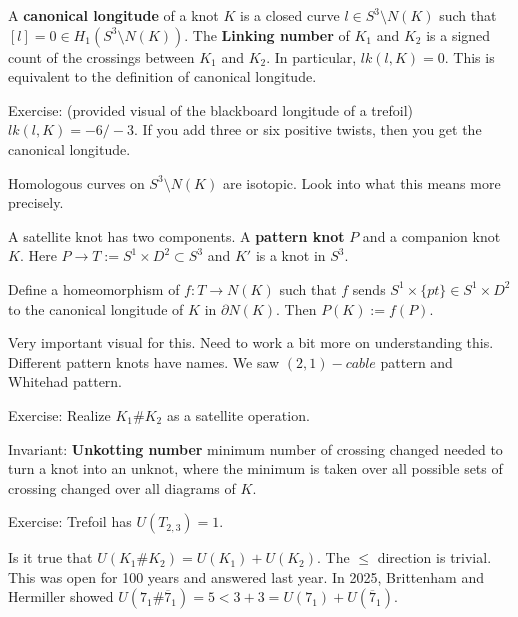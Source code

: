 \documentclass[12pt]{article}
\begin{document}
A \textbf{canonical longitude} of a knot $K$ is a closed curve $l \in S^3 \setminus N(K)$ such that $[l] = 0 \in H_1(S^3 \setminus N(K))$. \bbni
The \textbf{Linking number} of $K_1$ and $K_2$ is a signed count of the crossings between $K_1$ and $K_2$. In particular, $lk(l, K) = 0$. This is equivalent to the definition of canonical longitude. \bbni

Exercise: (provided visual of the blackboard longitude of a trefoil) $lk(l, K) = -6 / -3$. \bbni
If you add three or six positive twists, then you get the canonical longitude. \bbni 

Homologous curves on $S^3 \setminus N(K)$ are isotopic. Look into what this means more precisely. \bbni

A satellite knot has two components. A \textbf{pattern knot} $P$ and a companion knot $K$. Here $P \to T:=  S^1 \times D^2 \subset S^3$ and $K'$ is a knot in $S^3$.\bbni

Define a homeomorphism of $f: T \to N(K)$ such that $f$ sends $S^1 \times \{pt\} \in S^1 \times D^2$ to the canonical longitude of $K$ in $\partial N(K)$. Then $P(K) := f(P)$. \bbni

Very important visual for this. Need to work a bit more on understanding this. \bbni 
Different pattern knots have names. We saw $(2,1)-cable$ pattern and Whitehad pattern. \bbni

Exercise: Realize $K_1 \# K_2$ as a satellite operation. \bbni

Invariant: \textbf{Unkotting number} minimum number of crossing changed needed to turn a knot into an unknot, where the minimum is taken over all possible sets of crossing changed over all diagrams of $K$. \bbni

Exercise: Trefoil has $U(T_{2,3}) =1$. \bbni

Is it true that $U(K_1 \# K_2) = U(K_1) + U(K_2)$. The $\leq$ direction is trivial. This was open for 100 years and answered last year. In 2025, Brittenham and Hermiller showed $U(7_1 \# \overline{7}_1) = 5 < 3+3 = U(7_1) + U(\overline{7}_1)$.
\end{document}
